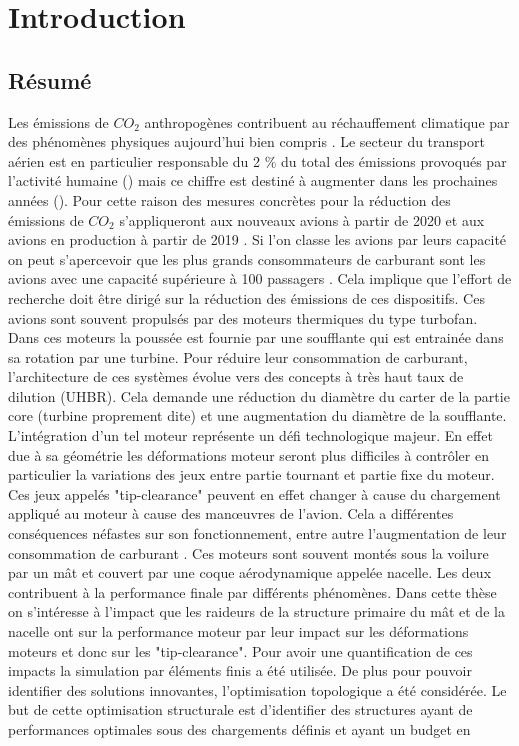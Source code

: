 \chapter*{Introduction}
\label{chap:introduction}
\begin{mdframed}[hidealllines=true,backgroundcolor=lightgray!20]
\section*{Résumé}
Les émissions de $CO_2$ anthropogènes contribuent au réchauffement climatique par des phénomènes physiques aujourd'hui bien compris \cite{change2007physical}. Le secteur du transport aérien est en particulier responsable du 2 $\%$  du total des émissions provoqués par l'activité humaine (\cite{icao2016environmental}) mais ce chiffre est destiné à augmenter dans les prochaines années (\cite{terrenoire2019contribution}).  Pour cette raison des mesures concrètes pour la réduction des émissions de $CO_2$ s'appliqueront aux nouveaux avions à partir de 2020 et aux avions en production à partir de 2019 \cite{national2016commercial}. Si l'on classe les avions par leurs capacité on peut s'apercevoir que les plus grands consommateurs de carburant sont les avions avec une capacité supérieure à 100 passagers \cite{yutko2011approaches,epstein2019considerations}. Cela implique que l'effort de recherche doit être dirigé sur la réduction des émissions de ces dispositifs. Ces avions sont souvent propulsés par des moteurs thermiques du type turbofan. Dans ces moteurs la poussée est fournie par une soufflante qui est entrainée dans sa rotation par une turbine. Pour réduire leur consommation de carburant, l'architecture de ces systèmes évolue vers des concepts à très haut taux de dilution (UHBR). Cela demande une réduction du diamètre du carter de la partie core (turbine proprement dite) et une augmentation du diamètre de la soufflante. L'intégration d'un tel moteur représente un défi technologique majeur. En effet due à sa géométrie les déformations moteur seront plus difficiles à contrôler en particulier la variations des jeux entre partie tournant et partie fixe du moteur. Ces jeux appelés "tip-clearance" peuvent en effet changer à cause du chargement appliqué au moteur à cause des manœuvres de l'avion. Cela a différentes conséquences néfastes sur son fonctionnement, entre autre l'augmentation de leur consommation de carburant \cite{lattime2002turbine}.  Ces moteurs sont souvent montés sous la voilure par un mât et couvert par une coque aérodynamique appelée nacelle. Les deux contribuent à la performance finale par différents phénomènes. Dans cette thèse on s'intéresse à l'impact que les raideurs de la structure primaire du mât et de la nacelle ont sur la performance moteur par leur impact sur les déformations moteurs et donc sur les "tip-clearance". Pour avoir une quantification de ces impacts la simulation par éléments finis a été utilisée. De plus pour pouvoir identifier des solutions innovantes, l'optimisation topologique a été considérée. Le but de cette optimisation structurale est d'identifier des structures ayant de performances optimales sous des chargements définis et ayant un budget en 
\end{mdframed}
